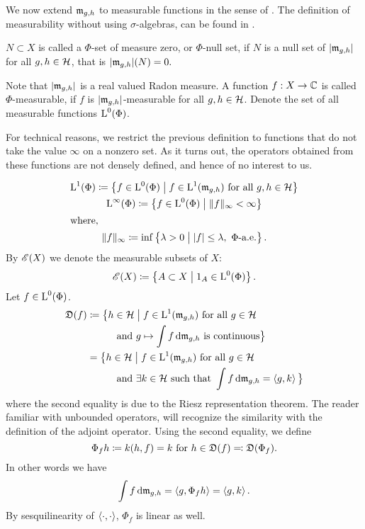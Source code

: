 % 
% 
We now extend $\mathfrak{m}_{g,h}$ to measurable functions in the sense of 
\cite[Ch. 4.5]{PedAnaN}.  The definition
 of measurability without using $\sigma$-algebras, can be found in
 \cite[Ch. 6.3]{PedAnaN}.
\begin{defi}
 $N \subset X$ is called a $\Phi$-set of measure zero, or $\Phi$-null set, if
 $N$ is a null set of $| \mathfrak{m}_{g,h}|$ for all $g,h \in \mathcal{H}$, that is  
  $| \mathfrak{m}_{g, h} | (N) =0.$
  
 Note that $| \mathfrak{m}_{g, h} |$ is a real valued Radon measure. 
 A function $f: X \to \mathbb{C}$ is called $\Phi$-measurable, if $f$ is 
 $|\mathfrak{m}_{g,h}|$-measurable for all $g,h \in \mathcal{H}$. 
 Denote the set of all measurable functions  ${\text{L}^0}(\Phi)$.
 
  For technical 
 reasons, we restrict the previous definition
 to functions that do not take the value $\infty$ on a nonzero set. As it turns
out, the operators obtained from these functions are not densely defined,
and hence of no interest to us. 

 \begin{gather*}
   {\text{L}^1}(\Phi) \coloneqq \left\lbrace f \in {\text{L}^0}(\Phi) \bigm | f \in \text{L}^1 (\mathfrak{m}_{g,h}) 
   \text{ for all }g,h \in \mathcal{H} \right\rbrace \\
   {\text{L}^\infty}(\Phi) \coloneqq \left\lbrace f \in {\text{L}^0}(\Phi) \bigm |  \|f \| _\infty 
   < \infty \right\rbrace\\
   \shortintertext{where, }
  \| f \| _\infty \coloneqq  \inf \left\lbrace \lambda > 0 \bigm |
    |f| \leq \lambda,  ~\Phi\text{-a.e.}\right\rbrace.
 \end{gather*}
  By $\mathscr{E}(X)$ we denote the measurable subsets of $X$:
 \[
 \mathscr{E}(X) \coloneqq \left\lbrace A \subset X \bigm | 1_A \in {\text{L}^0}(\Phi) \right\rbrace.
 \]
 Let $f \in {\text{L}^0}(\Phi)$.
 \begin{align*}
 \mathfrak{D}(f) &\coloneqq \big\lbrace h \in \mathcal{H} \bigm | f \in \text{L}^1  (\mathfrak{m}_{g,h})
 \text{ for all } g
 \in \mathcal{H}\\
 &~~~~~~~~\text{ and } g \mapsto \int f \operatorname{d}\! \mathfrak{m}_{g, h} \text{ is continuous} 
 \big\rbrace\\
 &=  \big\lbrace h \in \mathcal{H} \bigm | f \in \text{L}^1 (\mathfrak{m}_{g,h}) \text{ for all } g \in
 \mathcal{H} \\
 &~~~~~~~~\text{ and } \exists k \in \mathcal{H} \text{ such that } \int f \operatorname{d}\! \mathfrak{m}_{g,h}
 = \left\langle g, k \right\rangle \big\rbrace
 \end{align*}
where the second equality is due to the Riesz representation theorem. The 
reader familiar with unbounded operators, will recognize the similarity
with the definition of the adjoint operator.
Using the second equality, we define 
\[
\Phi_f h \coloneqq k(h, f) = k \text{ for } h \in \mathfrak{D}(f) \eqqcolon
\mathfrak{D}(\Phi_f).
\]
In other words we have 
\[
\int f \operatorname{d}\! \mathfrak{m}_{g,h} = \left\langle g, \Phi_f h \right\rangle = \left\langle g, k \right\rangle.
\]
By sesquilinearity of $\left\langle \cdot, \cdot \right\rangle$, $\Phi_f$ is linear as well.
\end{defi}


